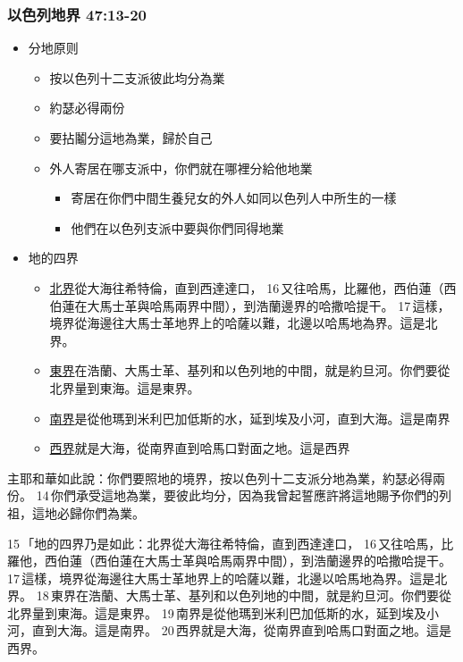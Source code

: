 \subsubsection{以色列地界 47:13-20}
\begin{itemize}
\itemsep-.45em  
\item 分地原则
\begin{itemize}
\itemsep-.45em  
\item 按以色列十二支派彼此均分為業
\item 約瑟必得兩份
\item 要拈鬮分這地為業，歸於自己
\item 外人寄居在哪支派中，你們就在哪裡分給他地業
\begin{itemize}
\itemsep-.45em  
\item 寄居在你們中間生養兒女的外人如同以色列人中所生的一樣
\item 他們在以色列支派中要與你們同得地業
\end{itemize}
\end{itemize}
\item 地的四界
\begin{itemize}
\itemsep-.45em  
\item \underline{北界}從大海往希特倫，直到西達達口， 16 又往哈馬，比羅他，西伯蓮（西伯蓮在大馬士革與哈馬兩界中間），到浩蘭邊界的哈撒哈提干。 17 這樣，境界從海邊往大馬士革地界上的哈薩以難，北邊以哈馬地為界。這是北界。
\item \underline{東界}在浩蘭、大馬士革、基列和以色列地的中間，就是約旦河。你們要從北界量到東海。這是東界。
\item \underline{南界}是從他瑪到米利巴加低斯的水，延到埃及小河，直到大海。這是南界
\item \underline{西界}就是大海，從南界直到哈馬口對面之地。這是西界
\end{itemize}
\end{itemize}
主耶和華如此說：你們要照地的境界，按以色列十二支派分地為業，約瑟必得兩份。 14 你們承受這地為業，要彼此均分，因為我曾起誓應許將這地賜予你們的列祖，這地必歸你們為業。

15 「地的四界乃是如此：北界從大海往希特倫，直到西達達口， 16 又往哈馬，比羅他，西伯蓮（西伯蓮在大馬士革與哈馬兩界中間），到浩蘭邊界的哈撒哈提干。 17 這樣，境界從海邊往大馬士革地界上的哈薩以難，北邊以哈馬地為界。這是北界。 18 東界在浩蘭、大馬士革、基列和以色列地的中間，就是約旦河。你們要從北界量到東海。這是東界。 19 南界是從他瑪到米利巴加低斯的水，延到埃及小河，直到大海。這是南界。 20 西界就是大海，從南界直到哈馬口對面之地。這是西界。


